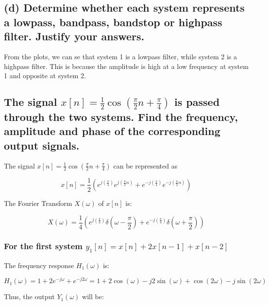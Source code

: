  
 \subsection*{(d) Determine whether each system represents a lowpass, bandpass,
 bandstop or highpass filter. Justify your answers.}
 From the plots, we can se that system 1 is a lowpass filter, while system 2 is a highpass filter. This is because the amplitude is high at a low frequency at system 1 and opposite at system 2.

 \subsection*{The signal $ x[n]=\frac{1}{2} \cos \left(\frac{\pi}{2} n+\frac{\pi}{4}\right) $ is passed through the two systems. Find the frequency, amplitude and phase of the corresponding output signals.}
The signal $ x[n]=\frac{1}{2} \cos \left(\frac{\pi}{2} n+\frac{\pi}{4}\right) $ can be represented as

\begin{equation*}
     x[n]=\frac{1}{2}\left(e^{j\left(\frac{\pi}{4}\right)} e^{j\left(\frac{\pi}{2} n\right)}+e^{-j\left(\frac{\pi}{4}\right)} e^{-j\left(\frac{\pi}{2} n\right)}\right) 
\end{equation*}

 The Fourier Transform $ X(\omega) $ of $ x[n] $ is:

 \begin{equation*}
 X(\omega) = \frac{1}{4} \left( e^{j\left(\frac{\pi}{4}\right)} \delta\left(\omega-\frac{\pi}{2}\right) + e^{-j\left(\frac{\pi}{4}\right)} \delta\left(\omega+\frac{\pi}{2}\right) \right)
 \end{equation*}
 \subsubsection*{For the first system $ y_1[n] = x[n] + 2x[n-1] + x[n-2] $}

The frequency response $ H_1(\omega) $ is:

\begin{equation*}
H_1(\omega) = 1 + 2e^{-j\omega} + e^{-j2\omega} = 1 + 2 \cos(\omega) - j2 \sin(\omega) + \cos(2\omega) - j \sin(2\omega)
\end{equation*}



Thus, the output $ Y_1(\omega) $ will be:

